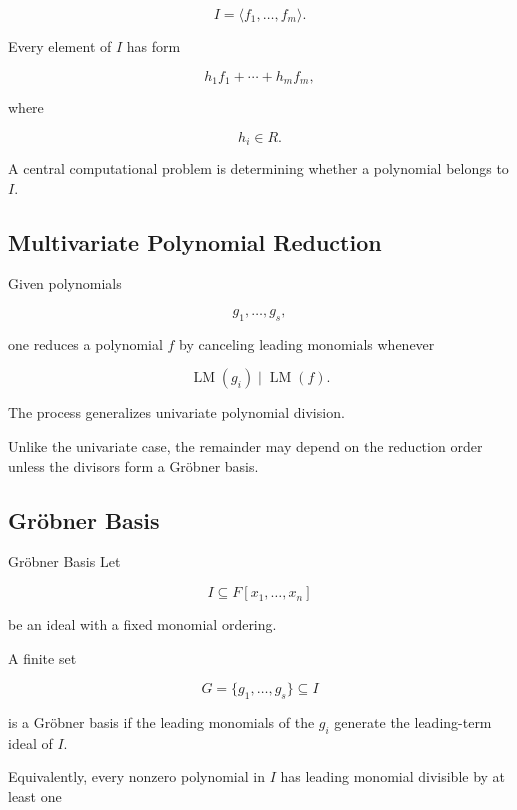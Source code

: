\[
\boxed{
I
=
\langle
f_1,\ldots,f_m
\rangle.
}
\]

Every element of \(I\) has form

\[
\boxed{
h_1f_1+\cdots+h_mf_m,
}
\]

where

\[
h_i\in R.
\]

A central computational problem is determining whether a polynomial belongs
to \(I\).

\subsection{Multivariate Polynomial Reduction}
\label{subsec:multivariate-polynomial-reduction}

Given polynomials

\[
g_1,\ldots,g_s,
\]

one reduces a polynomial \(f\) by canceling leading monomials whenever

\[
\boxed{
\operatorname{LM}(g_i)
\mid
\operatorname{LM}(f).
}
\]

The process generalizes univariate polynomial division.

Unlike the univariate case, the remainder may depend on the reduction
order unless the divisors form a Gröbner basis.

\subsection{Gröbner Basis}
\label{subsec:computer-algebra-groebner-basis}

\begin{definitionbox}{Gröbner Basis}
Let

\[
I
\subseteq
F[x_1,\ldots,x_n]
\]

be an ideal with a fixed monomial ordering.

A finite set

\[
G
=
\{g_1,\ldots,g_s\}
\subseteq I
\]

is a Gröbner basis if the leading monomials of the \(g_i\) generate the
leading-term ideal of \(I\).
\end{definitionbox}

Equivalently, every nonzero polynomial in \(I\) has leading monomial
divisible by at least one

